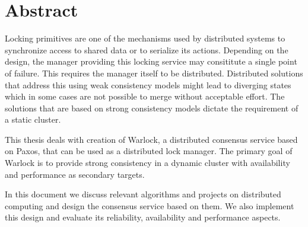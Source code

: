 \chapter{Abstract}

Locking primitives are one of the mechanisms used by distributed systems
to synchronize access to shared data or to serialize its actions. Depending
on the design, the manager providing this locking service may consititute
a single point of failure. This requires the manager itself to be
distributed. Distributed solutions that address this using weak consistency 
models might lead to diverging states which in some cases are not possible to
merge without acceptable effort. The solutions that are based on strong
consistency models dictate the requirement of a static cluster.

This thesis deals with creation of Warlock, a distributed
consensus service based on Paxos, that can be used as a distributed lock 
manager. The primary goal of Warlock is to provide strong consistency in a
dynamic cluster with availability and performance as secondary targets.

In this document we discuss relevant algorithms and projects on distributed 
computing and design the consensus service based on them. We also implement 
this design and evaluate its reliability, availability and performance aspects.
